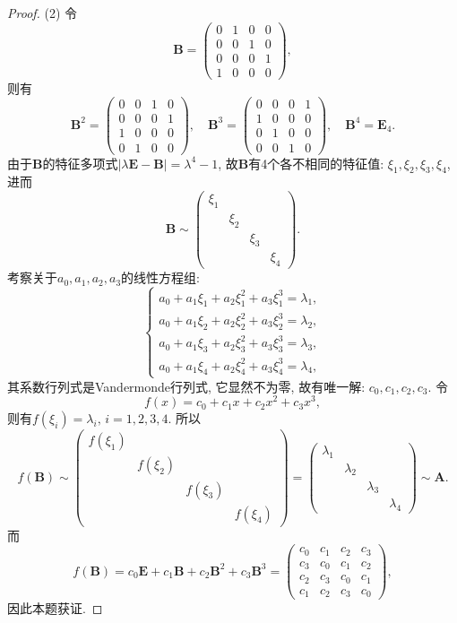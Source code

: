 \documentclass[../../main.tex]{subfiles}
\begin{document}
\begin{proof}
(2) 令
$$
\boldsymbol{B} = \begin{pmatrix}
0 & 1 & 0 & 0 \\
0 & 0 & 1 & 0 \\
0 & 0 & 0 & 1 \\
1 & 0 & 0 & 0
\end{pmatrix},
$$
则有
$$
\boldsymbol{B}^2 = \begin{pmatrix}
0 & 0 & 1 & 0 \\
0 & 0 & 0 & 1 \\
1 & 0 & 0 & 0 \\
0 & 1 & 0 & 0
\end{pmatrix}, \quad \boldsymbol{B}^3 = \begin{pmatrix}
0 & 0 & 0 & 1 \\
1 & 0 & 0 & 0 \\
0 & 1 & 0 & 0 \\
0 & 0 & 1 & 0
\end{pmatrix}, \quad \boldsymbol{B}^4 = \boldsymbol{E}_4.
$$
由于$\boldsymbol{B}$的特征多项式$|\lambda \boldsymbol{E} - \boldsymbol{B}| = \lambda^4 - 1$, 故$\boldsymbol{B}$有4个各不相同的特征值: $\xi_1,\xi_2,\xi_3,\xi_4$, 进而
$$
\boldsymbol{B} \sim \begin{pmatrix}
\xi_1 & & & \\
& \xi_2 & & \\
& & \xi_3 & \\
& & & \xi_4
\end{pmatrix}.
$$
考察关于$a_0,a_1,a_2,a_3$的线性方程组:
$$
\begin{cases}
a_0 + a_1 \xi_1 + a_2 \xi_1^2 + a_3 \xi_1^3 = \lambda_1, \\
a_0 + a_1 \xi_2 + a_2 \xi_2^2 + a_3 \xi_2^3 = \lambda_2, \\
a_0 + a_1 \xi_3 + a_2 \xi_3^2 + a_3 \xi_3^3 = \lambda_3, \\
a_0 + a_1 \xi_4 + a_2 \xi_4^2 + a_3 \xi_4^3 = \lambda_4,
\end{cases}
$$
其系数行列式是Vandermonde行列式, 它显然不为零, 故有唯一解: $c_0,c_1,c_2,c_3$. 令
$$
f(x) = c_0 + c_1 x + c_2 x^2 + c_3 x^3,
$$
则有$f(\xi_i) = \lambda_i, \, i = 1,2,3,4$. 所以
$$
f(\boldsymbol{B}) \sim \begin{pmatrix}
f(\xi_1) & & & \\
& f(\xi_2) & & \\
& & f(\xi_3) & \\
& & & f(\xi_4)
\end{pmatrix} = \begin{pmatrix}
\lambda_1 & & & \\
& \lambda_2 & & \\
& & \lambda_3 & \\
& & & \lambda_4
\end{pmatrix} \sim \boldsymbol{A}.
$$
而
$$
f(\boldsymbol{B}) = c_0 \boldsymbol{E} + c_1 \boldsymbol{B} + c_2 \boldsymbol{B}^2 + c_3 \boldsymbol{B}^3 = \begin{pmatrix}
c_0 & c_1 & c_2 & c_3 \\
c_3 & c_0 & c_1 & c_2 \\
c_2 & c_3 & c_0 & c_1 \\
c_1 & c_2 & c_3 & c_0
\end{pmatrix},
$$
因此本题获证.


\end{proof}
\end{document}

